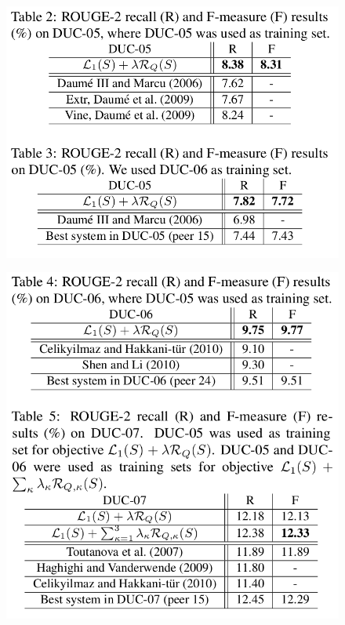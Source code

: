 \documentclass[xcolor={table}]{beamer}
\begin{document}
\begin{frame}[t]{\cite{lin2011class}}
      \begin{figure}[h]
      \includegraphics[scale=.26]{images/table2-3-lin11.png} \\
  \end{figure}
\end{frame}


\begin{frame}[t]{\cite{lin2011class}}
      \begin{figure}[h]
      \includegraphics[scale=.26]{images/table4-5-lin11.png} \\
  \end{figure}
\end{frame}
\end{document}
